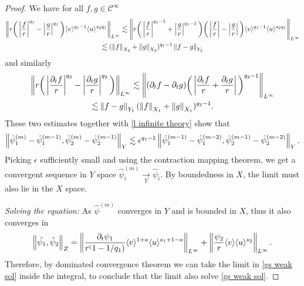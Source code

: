 \documentclass[11pt, oneside]{amsart}
\begin{document}
\begin{proof}
		We have for all $f,g\in\mathcal{C}^\infty$
		\begin{equation*}
			\begin{gathered}
				\left\lVert r\bigg(\left\lvert \frac{f}{r}\right\rvert^{q_1}-\left\lvert \frac{g}{r}\right\rvert^{q_1}\bigg)\langle 
						v \rangle^{q_1-1}\langle u \rangle^{s_2q_1}\right\rVert_{L^\infty}\lesssim
				\left\lVert r\bigg(\left\lvert \frac{f}{r}\right\rvert^{q_1-1}+\left\lvert \frac{g}{r}\right\rvert^{q_1-1}\bigg)\bigg(\left\lvert \frac{f}{r}\right\rvert-\left\lvert \frac{g}{r}\right\rvert\bigg)\langle 
						v \rangle^{q_1-1}\langle u \rangle^{s_2q_1}\right\rVert_{L^\infty}\\\lesssim(\left\lVert f\right\rVert_{X_2}+\left\lVert g\right\rVert_{X_2})^{q_1-1}\left\lVert f-g\right\rVert_{Y_2}
			\end{gathered}
		\end{equation*}
		and similarly
		\begin{equation*}
			\begin{gathered}
				\left\lVert r\bigg(\left\lvert \frac{\partial_tf}{r}\right\rvert^{q_2}-\left\lvert \frac{\partial_tg}{r}\right\rvert^{q_2}\bigg)\right\rVert_{L^\infty}\lesssim\left\lVert (\partial_tf-\partial_tg)\bigg(\left\lvert \frac{\partial_tf}{r}+\frac{\partial_tg}{r}\right\rvert\bigg)^{q_2-1}\right\rVert_{L^\infty}\\
				\lesssim\left\lVert f-g\right\rVert_{Y_1}(\left\lVert f\right\rVert_{X_1}+\left\lVert g\right\rVert_{X_1})^{q_2-1}.
			\end{gathered}
		\end{equation*}
		These two estimates together with \cref{l infinite theory} show that 
		\begin{equation*}
			\begin{gathered}
				\left\lVert \hat{\psi}_1^{(m)}-\hat{\psi}^{(m-1)}_1,\hat{\psi}_2^{(m)}-\hat{\psi}^{(m-1)}_2\right\rVert_Y\lesssim\epsilon^{q_1-1}\left\lVert \hat{\psi}_1^{(m-1)}-\hat{\psi}_1^{(m-2)},\hat{\psi}_2^{(m-1)}-\hat{\psi}^{(m-2)}_2\right\rVert_Y.
			\end{gathered}
		\end{equation*}
		Picking $\epsilon$ sufficiently small and using the contraction mapping theorem, we get a convergent sequence in $Y$ space $\hat{\psi}_i^{(m)}\underset{Y}{\to}\hat{\psi}_i$. By boundedness in $X$, the limit must also lie in the $X$ space.
		
		\textit{Solving the equation:} As $\hat{\psi}^{(m)}$ converges in $Y$ and is bounded in $X$, thus it also converges in 
		\begin{equation*}
			\begin{gathered}
				\left\lVert \hat{\psi_1},\hat{\psi}_2\right\rVert_Z=	\left\lVert \frac{\partial_t\psi_1}{r^(1-1/q_1)}\langle v \rangle^{1+a}\langle u \rangle^{s_1+1-a}\right\rVert_{L^\infty}+\left\lVert \frac{\psi_2}{r}\langle v \rangle\langle u \rangle^{s_2}\right\rVert_{L^\infty}.
			\end{gathered}
		\end{equation*}
		Therefore, by dominated convergence theorem we can take the limit in \cref{gs weak sol} inside the integral, to conclude that the limit also solve \cref{gs weak sol}.
	\end{proof}
	
\end{document}
